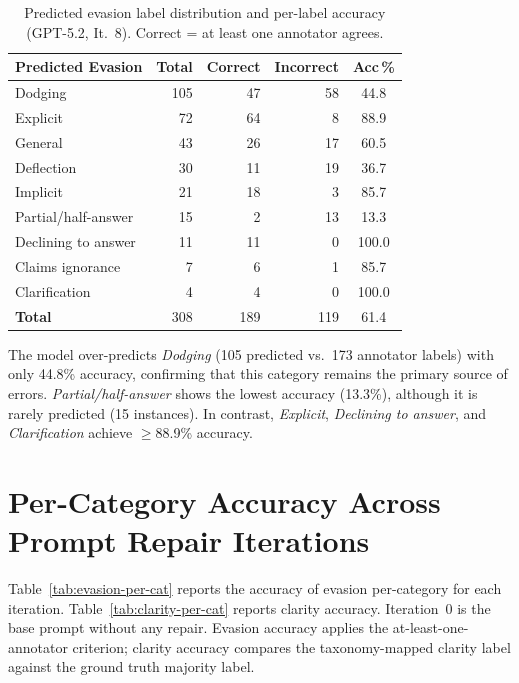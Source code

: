 \documentclass[11pt]{article}
\begin{document}
\begin{table}[H]
\centering
\small
\begin{tabular}{@{}lrrrc@{}}
\toprule
\textbf{Predicted Evasion} & \textbf{Total} & \textbf{Correct} & \textbf{Incorrect} & \textbf{Acc\,\%} \\
\midrule
Dodging & 105 & 47 & 58 & 44.8 \\
Explicit & 72 & 64 & 8 & 88.9 \\
General & 43 & 26 & 17 & 60.5 \\
Deflection & 30 & 11 & 19 & 36.7 \\
Implicit & 21 & 18 & 3 & 85.7 \\
Partial/half-answer & 15 & 2 & 13 & 13.3 \\
Declining to answer & 11 & 11 & 0 & 100.0 \\
Claims ignorance & 7 & 6 & 1 & 85.7 \\
Clarification & 4 & 4 & 0 & 100.0 \\
\midrule
\textbf{Total} & 308 & 189 & 119 & 61.4 \\
\bottomrule
\end{tabular}
\caption{Predicted evasion label distribution and per-label accuracy (GPT-5.2, It.~8). Correct = at least one annotator agrees.}
\label{tab:pred-evasion}
\end{table}

The model over-predicts \emph{Dodging} (105 predicted vs.\ 173 annotator labels) with only 44.8\% accuracy, confirming that this category remains the primary source of errors.
\emph{Partial/half-answer} shows the lowest accuracy (13.3\%), although it is rarely predicted (15 instances).
In contrast, \emph{Explicit}, \emph{Declining to answer}, and \emph{Clarification} achieve ${\geq}$88.9\% accuracy.

\section{Per-Category Accuracy Across Prompt Repair Iterations}
\label{sec:appendix-per-category}

Table~\ref{tab:evasion-per-cat} reports the accuracy of evasion per-category for each iteration. Table~\ref{tab:clarity-per-cat} reports clarity accuracy.
Iteration~0 is the base prompt without any repair.
Evasion accuracy applies the at-least-one-annotator criterion; clarity accuracy compares the taxonomy-mapped clarity label against the ground truth majority label.
\end{document}
